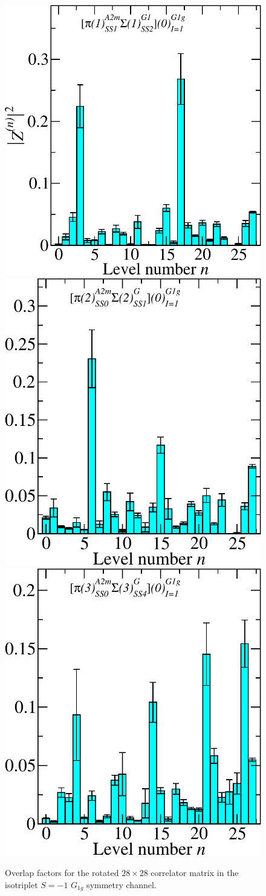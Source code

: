 \begin{figure}[H]
    \includegraphics[width=.1975\textwidth]{figures/sigmas/g1g/zfactors/zfactor_isotriplet_pion_sigma-G1g_1-P001-A2m-SS_1-P00-1-G1-SS_2.pdf}
    \hspace*{-0.06cm}\includegraphics[width=.185\textwidth]{figures/sigmas/g1g/zfactors/zfactor_isotriplet_pion_sigma-G1g_1-P011-A2m-SS_0-P0-1-1-G-SS_1.pdf}
    \hspace*{-0.06cm}\includegraphics[width=.185\textwidth]{figures/sigmas/g1g/zfactors/zfactor_isotriplet_pion_sigma-G1g_1-P111-A2m-SS_0-P-1-1-1-G-SS_4.pdf}
    \caption{Overlap factors for the rotated $28\times 28$ correlator matrix in the isotriplet $S=-1$ $G_{1g}$ symmetry channel.}\label{fig:g1g_zfactors}
\end{figure}
\renewcommand{\arraystretch}{1.2}
